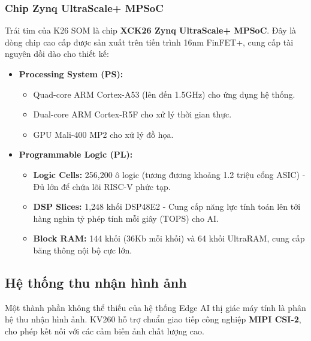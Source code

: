 \subsubsection{Chip Zynq UltraScale+ MPSoC}
Trái tim của K26 SOM là chip \textbf{XCK26 Zynq UltraScale+ MPSoC}. Đây là dòng chip cao cấp được sản xuất trên tiến trình 16nm FinFET+, cung cấp tài nguyên dồi dào cho thiết kế:
\begin{itemize}
    \item \textbf{Processing System (PS):}
        \begin{itemize}
            \item Quad-core ARM Cortex-A53 (lên đến 1.5GHz) cho ứng dụng hệ thống.
            \item Dual-core ARM Cortex-R5F cho xử lý thời gian thực.
            \item GPU Mali-400 MP2 cho xử lý đồ họa.
        \end{itemize}
    \item \textbf{Programmable Logic (PL):}
        \begin{itemize}
            \item \textbf{Logic Cells:} 256,200 ô logic (tương đương khoảng 1.2 triệu cổng ASIC) - Đủ lớn để chứa lõi RISC-V phức tạp.
            \item \textbf{DSP Slices:} 1,248 khối DSP48E2 - Cung cấp năng lực tính toán lên tới hàng nghìn tỷ phép tính mỗi giây (TOPS) cho AI.
            \item \textbf{Block RAM:} 144 khối (36Kb mỗi khối) và 64 khối UltraRAM, cung cấp băng thông nội bộ cực lớn.
        \end{itemize}
\end{itemize}

\subsection{Hệ thống thu nhận hình ảnh}
Một thành phần không thể thiếu của hệ thống Edge AI thị giác máy tính là phân hệ thu nhận hình ảnh. KV260 hỗ trợ chuẩn giao tiếp công nghiệp \textbf{MIPI CSI-2}, cho phép kết nối với các cảm biến ảnh chất lượng cao.

